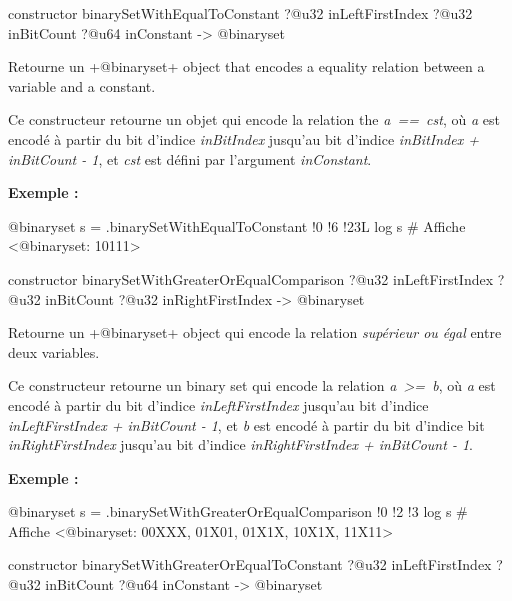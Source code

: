 
\begin{galgas4box}
constructor binarySetWithEqualToConstant
  ?@u32 inLeftFirstIndex
  ?@u32 inBitCount
  ?@u64 inConstant
  -> @binaryset
\end{galgas4box}


Retourne un \ggsq+@binaryset+ object that encodes a equality relation between a variable and a constant.

Ce constructeur retourne un objet qui encode la relation the \emph{a~==~cst}, où \emph {a} est encodé à partir du bit d'indice \emph{inBitIndex} jusqu'au bit d'indice \emph{inBitIndex  + inBitCount - 1}, et \emph{cst} est défini par l'argument \emph{inConstant}.

\textbf{Exemple :}
\begin{galgas4}
@binaryset s = .binarySetWithEqualToConstant {!0 !6 !23L}
log s # Affiche <@binaryset: 10111>
\end{galgas4}





\begin{galgas4box}
constructor binarySetWithGreaterOrEqualComparison
  ?@u32 inLeftFirstIndex
  ?@u32 inBitCount
  ?@u32 inRightFirstIndex
  -> @binaryset
\end{galgas4box}


Retourne un \ggsq+@binaryset+ object qui encode la relation \emph{supérieur ou égal} entre deux variables.

Ce constructeur retourne un binary set qui encode la relation \emph{a~>=~b}, où \emph{a} est encodé à partir du bit d'indice \emph{inLeftFirstIndex} jusqu'au bit d'indice \emph{inLeftFirstIndex  + inBitCount - 1}, et \emph{b} est encodé à partir du bit d'indice bit \emph{inRightFirstIndex} jusqu'au bit d'indice \emph{inRightFirstIndex + inBitCount - 1}.

\textbf{Exemple :}
\begin{galgas4}
@binaryset s = .binarySetWithGreaterOrEqualComparison {!0 !2 !3}
log s # Affiche <@binaryset: 00XXX, 01X01, 01X1X, 10X1X, 11X11>
\end{galgas4}




\begin{galgas4box}
constructor binarySetWithGreaterOrEqualToConstant
  ?@u32 inLeftFirstIndex
  ?@u32 inBitCount
  ?@u64 inConstant
  -> @binaryset
\end{galgas4box}



